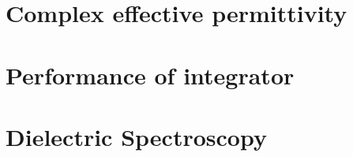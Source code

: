 \section{Complex effective permittivity}
\subsection{}

\section{Performance of integrator}

\section{Dielectric Spectroscopy}

